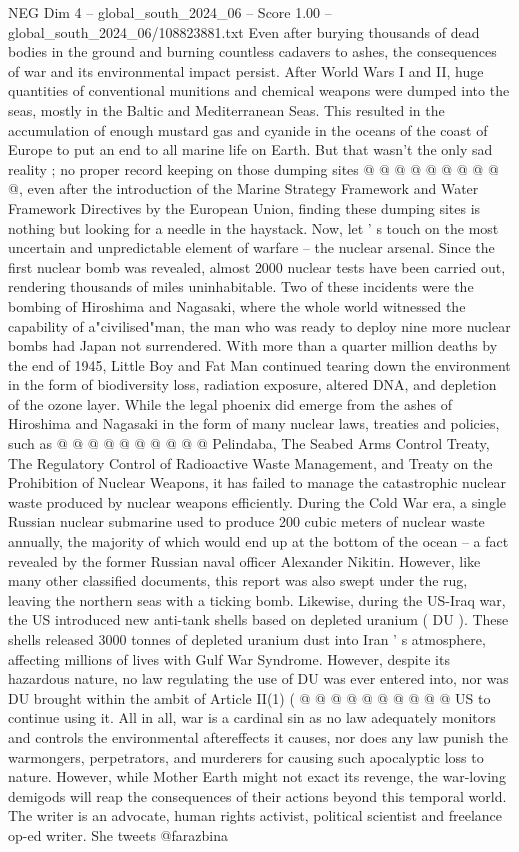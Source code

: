 \begin{textsample}{NEG Dim 4 – global\_south\_2024\_06 – Score 1.00 – global\_south\_2024\_06/108823881.txt}
Even after burying thousands of dead bodies in the ground and burning countless cadavers to ashes, the consequences of war and its environmental impact persist.
After World Wars I and II, huge quantities of conventional munitions and chemical weapons were dumped into the seas, mostly in the Baltic and Mediterranean Seas.
This resulted in the accumulation of enough mustard gas and cyanide in the oceans of the coast of Europe to put an end to all marine life on Earth.
But that wasn't the only sad reality ; no proper record keeping on those dumping sites @ @ @ @ @ @ @ @ @ @, even after the introduction of the Marine Strategy Framework and Water Framework Directives by the European Union, finding these dumping sites is nothing but looking for a needle in the haystack.
Now, let ' s touch on the most uncertain and unpredictable element of warfare -- the nuclear arsenal.
Since the first nuclear bomb was revealed, almost 2000 nuclear tests have been carried out, rendering thousands of miles uninhabitable.
Two of these incidents were the bombing of Hiroshima and Nagasaki, where the whole world witnessed the capability of a"civilised"man, the man who was ready to deploy nine more nuclear bombs had Japan not surrendered.
With more than a quarter million deaths by the end of 1945, Little Boy and Fat Man continued tearing down the environment in the form of biodiversity loss, radiation exposure, altered DNA, and depletion of the ozone layer.
While the legal phoenix did emerge from the ashes of Hiroshima and Nagasaki in the form of many nuclear laws, treaties and policies, such as @ @ @ @ @ @ @ @ @ @ Pelindaba, The Seabed Arms Control Treaty, The Regulatory Control of Radioactive Waste Management, and Treaty on the Prohibition of Nuclear Weapons, it has failed to manage the catastrophic nuclear waste produced by nuclear weapons efficiently.
During the Cold War era, a single Russian nuclear submarine used to produce 200 cubic meters of nuclear waste annually, the majority of which would end up at the bottom of the ocean -- a fact revealed by the former Russian naval officer Alexander Nikitin.
However, like many other classified documents, this report was also swept under the rug, leaving the northern seas with a ticking bomb.
Likewise, during the US-Iraq war, the US introduced new anti-tank shells based on depleted uranium ( DU ).
These shells released 3000 tonnes of depleted uranium dust into Iran ' s atmosphere, affecting millions of lives with Gulf War Syndrome.
However, despite its hazardous nature, no law regulating the use of DU was ever entered into, nor was DU brought within the ambit of Article II(1) ( @ @ @ @ @ @ @ @ @ @ US to continue using it.
All in all, war is a cardinal sin as no law adequately monitors and controls the environmental aftereffects it causes, nor does any law punish the warmongers, perpetrators, and murderers for causing such apocalyptic loss to nature.
However, while Mother Earth might not exact its revenge, the war-loving demigods will reap the consequences of their actions beyond this temporal world.
The writer is an advocate, human rights activist, political scientist and freelance op-ed writer.
She tweets @farazbina

\end{textsample}
